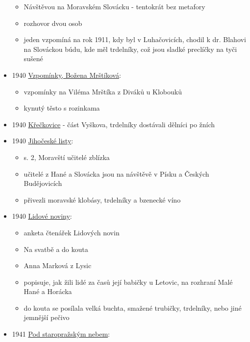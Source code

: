 \begin{itemize}
  \begin{itemize}
  \tightlist
  \item
    Návštěvou na Moravském Slovácku - tentokrát bez metafory
  \item
    rozhovor dvou osob
  \item
    jeden vzpomíná na rok 1911, kdy byl v Luhačovicích, chodil k dr.
    Blahovi na Slováckou búdu, kde měl trdelníky, což jsou sladké
    preclíčky na tyči sušené
  \end{itemize}
\item
  1940
  \href{https://ndk.cz/view/uuid:911977c0-052e-11e8-816d-5ef3fc9bb22f?page=uuid\%3Aa0797b50-0cb5-11e8-8ee4-005056825209}{Vzpomínky,
  Božena Mrštíková}:

  \begin{itemize}
  \tightlist
  \item
    vzpomínky na Viléma Mrštíka z Diváků u Klobouků
  \item
    kynutý těsto s rozinkama
  \end{itemize}
\item
  1940
  \href{https://ceskadigitalniknihovna.cz/view/uuid:d065e200-90ad-11e8-87bd-005056827e52?page=uuid:47609990-a79c-11e8-ba56-5ef3fc9bb22f&fulltext=trdeln\%C3\%ADky&source=nkp}{Křečkovice}
  - část Vyškova, trdelníky dostávali dělníci po žních
\item
  1940
  \href{https://ceskadigitalniknihovna.cz/uuid/uuid:c6220b36-bdd1-4eec-94b2-2bed755a042a}{Jihočeské
  listy}:

  \begin{itemize}
  \tightlist
  \item
    s. 2, Moravští učitelé zblízka
  \item
    učitelé z Hané a Slovácka jsou na návštěvě v Písku a Českých
    Budějovicích
  \item
    přivezli moravské klobásy, trdelníky a bzenecké víno
  \end{itemize}
\item
  1940
  \href{https://ceskadigitalniknihovna.cz/uuid/uuid:9582fdd0-6e03-11dd-a59e-000d606f5dc6}{Lidové
  noviny}:

  \begin{itemize}
  \tightlist
  \item
    anketa čtenářek Lidových novin
  \item
    Na svatbě a do kouta
  \item
    Anna Marková z Lysic
  \item
    popisuje, jak žili lidé za časů její babičky u Letovic, na rozhraní
    Malé Hané a Horácka
  \item
    do kouta se posílala velká buchta, smažené trubičky, trdelníky, nebo
    jiné jemnější pečivo
  \end{itemize}
\item
  1941
  \href{https://ceskadigitalniknihovna.cz/view/uuid:5247f390-0408-11ed-bd12-005056827e51?page=uuid\%3Ac9bca5eb-64b6-4861-a251-c29522db0865&fulltext=trdlovce&source=mzk}{Pod
  staropražským nebem}:


\end{itemize}
